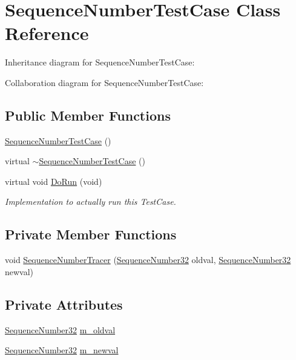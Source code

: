 \hypertarget{classSequenceNumberTestCase}{}\section{Sequence\+Number\+Test\+Case Class Reference}
\label{classSequenceNumberTestCase}


Inheritance diagram for Sequence\+Number\+Test\+Case\+:


Collaboration diagram for Sequence\+Number\+Test\+Case\+:
\subsection*{Public Member Functions}
\begin{DoxyCompactItemize}
\item 
\hyperlink{classSequenceNumberTestCase_a39260cf78d72047059ad363c2fb7f6b0}{Sequence\+Number\+Test\+Case} ()
\item 
virtual \hyperlink{classSequenceNumberTestCase_a26a04b3a9ed59ea27e605181b6f688c5}{$\sim$\+Sequence\+Number\+Test\+Case} ()
\item 
virtual void \hyperlink{classSequenceNumberTestCase_a292dbab31cc78b3d5ec16c2aa96711a2}{Do\+Run} (void)
\begin{DoxyCompactList}\small\item\em Implementation to actually run this Test\+Case. \end{DoxyCompactList}\end{DoxyCompactItemize}
\subsection*{Private Member Functions}
\begin{DoxyCompactItemize}
\item 
void \hyperlink{classSequenceNumberTestCase_a709ae62a4c7dd1357fa3ab32d0ff4d74}{Sequence\+Number\+Tracer} (\hyperlink{group__network_gacb2070e4e98d2d5135c9bede58f07a03}{Sequence\+Number32} oldval, \hyperlink{group__network_gacb2070e4e98d2d5135c9bede58f07a03}{Sequence\+Number32} newval)
\end{DoxyCompactItemize}
\subsection*{Private Attributes}
\begin{DoxyCompactItemize}
\item 
\hyperlink{group__network_gacb2070e4e98d2d5135c9bede58f07a03}{Sequence\+Number32} \hyperlink{classSequenceNumberTestCase_a508cbf71bf152086776cefc6816ce98b}{m\+\_\+oldval}
\item 
\hyperlink{group__network_gacb2070e4e98d2d5135c9bede58f07a03}{Sequence\+Number32} \hyperlink{classSequenceNumberTestCase_a85d954722c4fabd7278e49869765b94c}{m\+\_\+newval}
\end{DoxyCompactItemize}
